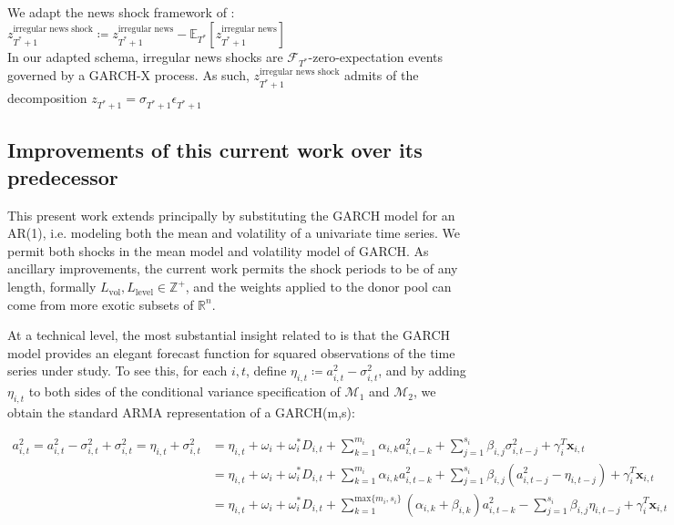 \documentclass[11pt]{article}
\newcommand{\x}{\textbf{x}}
\def\mc#1{\mathcal{#1}} %
\def\E{\mathbb{E}} %
\def\mc#1{\mathcal{#1}}
\theoremstyle{definition}
\begin{document}
We adapt the news shock framework of \citet{kilian2017structural}: \\

$z_{T^{*}+1}^{\text{irregular news shock}} \coloneqq z_{T^{*}+1}^{\text{irregular news}} - \E_{T^{*}}[z_{T^{*}+1}^{\text{irregular news}}]$ \\

In our adapted schema, irregular news shocks are $\mathcal{F}_{T^{*}}$-zero-expectation events governed by a GARCH-X process.  As such, $z_{T^{*}+1}^{\text{irregular news shock}}$ admits of the decomposition $z_{T^{*}+1} = \sigma_{T^{*}+1}\epsilon_{T^{*}+1}$

\subsection{Improvements of this current work over its predecessor}
This present work extends \citet{lin2021minimizing} principally by substituting the GARCH model for an AR(1), i.e. modeling both the mean and volatility of a univariate time series.  We permit both shocks in the mean model and volatility model of GARCH.  As ancillary improvements, the current work permits the shock periods to be of any length, formally $L_{\text{vol}}, L_{\text{level}} \in \mathbb{Z}^{+}$, and the weights applied to the donor pool can come from more exotic subsets of $\mathbb{R}^{n}$.  

At a technical level, the most substantial insight related to \citet{lin2021minimizing} is that the GARCH model provides an elegant forecast function for squared observations of the time series under study. To see this, for each $i,t$, define $\eta_{i,t} \coloneqq a^{2}_{i,t} - \sigma^{2}_{i,t}$, and by adding $\eta_{i,t}$ to both sides of the conditional variance specification of $\mc{M}_1$ and $\mc{M}_2$, we obtain the standard ARMA representation of a GARCH(m,s):

\begin{align}
a^{2}_{i,t} = a^{2}_{i,t} - \sigma^{2}_{i,t} + \sigma^{2}_{i,t} = \eta_{i,t} + \sigma^{2}_{i,t} &= \eta_{i,t} + \omega_{i} + \omega^{*}_i D_{i,t}  + \sum^{m_{i}}_{k=1}\alpha_{i,k}a^{2}_{i,t-k} + \sum_{j=1}^{s_{i}}\beta_{i,j}\sigma_{i,t-j}^{2} + \gamma_{i}^{T} \x_{i,t} \\
    &= \eta_{i,t} + \omega_{i} + \omega^{*}_i D_{i,t}  + \sum^{m_{i}}_{k=1}\alpha_{i,k}a^{2}_{i,t-k}  + \sum_{j=1}^{s_{i}}\beta_{i,j}(a^{2}_{i,t-j} - \eta_{i,t-j}) + \gamma_{i}^{T} \x_{i,t} \\
    &= \eta_{i,t} + \omega_{i} + \omega^{*}_i D_{i,t}  + \sum^{\text{max}\{m_{i},s_{i}\}}_{k=1}(\alpha_{i,k} + \beta_{i,k})a^{2}_{i,t-k} - \sum_{j=1}^{s_{i}}\beta_{i,j}\eta_{i,t-j} + \gamma_{i}^{T} \x_{i,t}\label{armarep}
\end{align}
\end{document}
